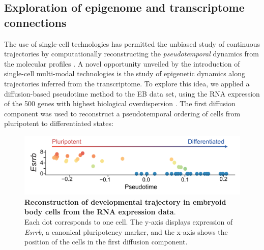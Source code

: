 

\subsection{Exploration of epigenome and transcriptome connections}

The use of single-cell technologies has permitted the unbiased study of continuous trajectories by computationally reconstructing the \textit{pseudotemporal} dynamics from the molecular profiles \cite{Trapnell2014,Haghverdi2016,Saelens2018}. A novel opportunity unveiled by the introduction of single-cell multi-modal technologies is the study of epigenetic dynamics along trajectories inferred from the transcriptome. To explore this idea, we applied a diffusion-based pseudotime method \cite{Haghverdi2016} to the EB data set, using the RNA expression of the 500 genes with highest biological overdispersion \cite{Lun2016b}. The first diffusion component was used to reconstruct a pseudotemporal ordering of cells from pluripotent to differentiated states:

\begin{figure}[H]
	\centering
	\includegraphics[width=0.75\linewidth]{scNMT_pseudotime}
	\caption[]{\textbf{Reconstruction of developmental trajectory in embryoid body cells from the RNA expression data}.\\
	Each dot corresponds to one cell. The y-axis displays expression of \textit{Esrrb}, a canonical pluripotency marker, and the x-axis shows the position of the cells in the first diffusion component.}
	\label{fig:scnmt_pseudotime}
\end{figure}


